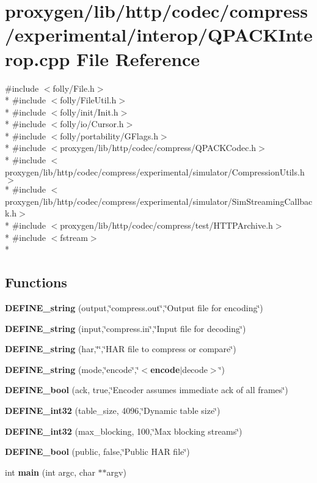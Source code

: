 \section{proxygen/lib/http/codec/compress/experimental/interop/\+Q\+P\+A\+C\+K\+Interop.cpp File Reference}
\label{QPACKInterop_8cpp}
{\ttfamily \#include $<$folly/\+File.\+h$>$}\\*
{\ttfamily \#include $<$folly/\+File\+Util.\+h$>$}\\*
{\ttfamily \#include $<$folly/init/\+Init.\+h$>$}\\*
{\ttfamily \#include $<$folly/io/\+Cursor.\+h$>$}\\*
{\ttfamily \#include $<$folly/portability/\+G\+Flags.\+h$>$}\\*
{\ttfamily \#include $<$proxygen/lib/http/codec/compress/\+Q\+P\+A\+C\+K\+Codec.\+h$>$}\\*
{\ttfamily \#include $<$proxygen/lib/http/codec/compress/experimental/simulator/\+Compression\+Utils.\+h$>$}\\*
{\ttfamily \#include $<$proxygen/lib/http/codec/compress/experimental/simulator/\+Sim\+Streaming\+Callback.\+h$>$}\\*
{\ttfamily \#include $<$proxygen/lib/http/codec/compress/test/\+H\+T\+T\+P\+Archive.\+h$>$}\\*
{\ttfamily \#include $<$fstream$>$}\\*
\subsection*{Functions}
\begin{DoxyCompactItemize}
\item 
{\bf D\+E\+F\+I\+N\+E\+\_\+string} (output,\char`\"{}compress.\+out\char`\"{},\char`\"{}Output file for encoding\char`\"{})
\item 
{\bf D\+E\+F\+I\+N\+E\+\_\+string} (input,\char`\"{}compress.\+in\char`\"{},\char`\"{}Input file for decoding\char`\"{})
\item 
{\bf D\+E\+F\+I\+N\+E\+\_\+string} (har,\char`\"{}\char`\"{},\char`\"{}H\+AR file to compress or compare\char`\"{})
\item 
{\bf D\+E\+F\+I\+N\+E\+\_\+string} (mode,\char`\"{}encode\char`\"{},\char`\"{}$<${\bf encode}$\vert$decode$>$\char`\"{})
\item 
{\bf D\+E\+F\+I\+N\+E\+\_\+bool} (ack, true,\char`\"{}Encoder assumes immediate ack of all frames\char`\"{})
\item 
{\bf D\+E\+F\+I\+N\+E\+\_\+int32} (table\+\_\+size, 4096,\char`\"{}Dynamic table size\char`\"{})
\item 
{\bf D\+E\+F\+I\+N\+E\+\_\+int32} (max\+\_\+blocking, 100,\char`\"{}Max blocking streams\char`\"{})
\item 
{\bf D\+E\+F\+I\+N\+E\+\_\+bool} (public, false,\char`\"{}Public H\+AR file\char`\"{})
\item 
int {\bf main} (int argc, char $\ast$$\ast$argv)
\end{DoxyCompactItemize}


